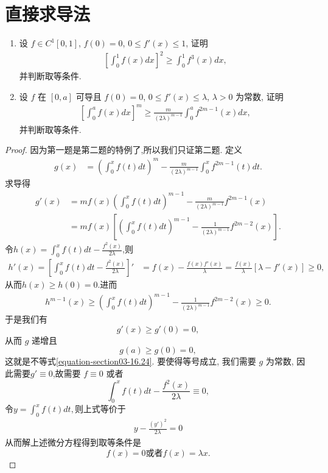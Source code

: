 \documentclass[../../main.tex]{subfiles}
\begin{document}
\section{直接求导法}

\begin{example}
\begin{enumerate}
\item 设 $f \in C^1[0,1]$, $f(0) = 0$, $0 \leqslant f'(x) \leqslant 1$, 证明
\begin{align*}
\left[\int_{0}^{1}f(x)dx\right]^2 \geqslant \int_{0}^{1}f^3(x)dx,
\end{align*}
并判断取等条件.

\item 设 $f$ 在 $[0,a]$ 可导且 $f(0) = 0$, $0 \leqslant f'(x) \leqslant \lambda$, $\lambda > 0$ 为常数, 证明
\begin{align}\label{equation-section03-16.24}
\left[\int_{0}^{a}f(x)dx\right]^m \geqslant \frac{m}{(2\lambda)^{m - 1}}\int_{0}^{a}f^{2m - 1}(x)dx,
\end{align}
并判断取等条件.
\end{enumerate}
\end{example}
\begin{proof}
因为第一题是第二题的特例了,所以我们只证第二题.
定义
\begin{align*}
g(x) &= \left(\int_{0}^{x}f(t)dt\right)^m - \frac{m}{(2\lambda)^{m - 1}}\int_{0}^{x}f^{2m - 1}(t)dt.
\end{align*}
求导得
\begin{align*}
g'(x) &= mf(x)\left(\int_{0}^{x}f(t)dt\right)^{m - 1} - \frac{m}{(2\lambda)^{m - 1}}f^{2m - 1}(x)\\
&= mf(x)\left[\left(\int_{0}^{x}f(t)dt\right)^{m - 1} - \frac{1}{(2\lambda)^{m - 1}}f^{2m - 2}(x)\right].
\end{align*}
令$h(x)=\int_{0}^{x}f(t)dt - \frac{f^2(x)}{2\lambda}$,则
\begin{align*}
h'(x)=\left[\int_{0}^{x}f(t)dt - \frac{f^2(x)}{2\lambda}\right]' &= f(x) - \frac{f(x)f'(x)}{\lambda} = \frac{f(x)}{\lambda}[\lambda - f'(x)] \geqslant 0,
\end{align*}
从而$h(x)\geq h(0)=0.$进而
\begin{align*}
h^{m-1}(x)\geqslant \left(\int_{0}^{x}f(t)dt\right)^{m - 1} - \frac{1}{(2\lambda)^{m - 1}}f^{2m - 2}(x)\geqslant 0.
\end{align*}
于是我们有
\[g'(x) \geqslant g'(0) = 0,\]
从而 $g$ 递增且
\[g(a) \geqslant g(0) = 0,\]
这就是不等式\eqref{equation-section03-16.24}.
要使得等号成立, 我们需要 $g$ 为常数, 因此需要$g'\equiv 0$,故需要 $f \equiv 0$ 或者
\[\int_{0}^{x}f(t)dt - \frac{f^2(x)}{2\lambda} \equiv 0,\]
令$y=\int_{0}^{x}f(t)dt,$则上式等价于
\begin{align*}
y-\frac{(y')^2}{2\lambda}=0
\end{align*}
从而解上述微分方程得到取等条件是
\[f(x) = 0\text{或者}f(x) = \lambda x.\]
\end{proof}
\end{document}

